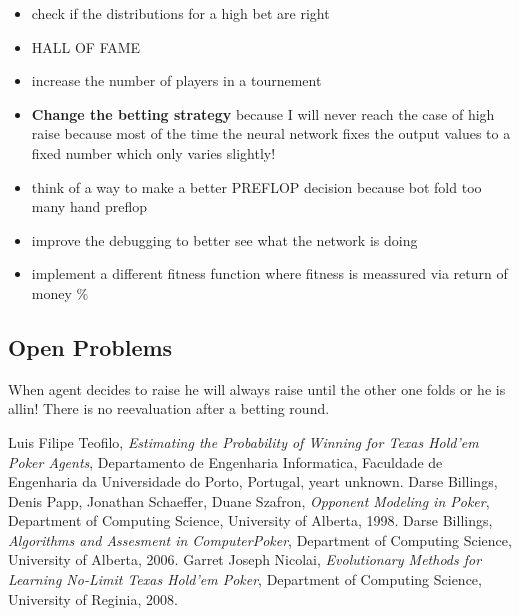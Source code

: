 \begin{itemize}
\item check if the distributions for a high bet are right
\item HALL OF FAME
\item increase the number of players in a tournement
\item \textbf{Change the betting strategy} because I will never reach the case of high raise because most of the time the neural network fixes the output values to a fixed number which only varies slightly!
\item think of a way to make a better PREFLOP decision because bot fold too many hand preflop
\item improve the debugging to better see what the network is doing
\item implement a different fitness function where fitness is meassured via return of money \%
\end{itemize}

\subsection{Open Problems}
\begin{itemize}
When agent decides to raise he will always raise until the other one folds or he is allin! There is no reevaluation after a betting round.
\end{itemize}


\begin{thebibliography}{9}
  Luis Filipe Teofilo,
  \textit{Estimating the Probability of Winning for Texas Hold'em Poker Agents},
  Departamento de Engenharia Informatica, Faculdade de Engenharia da Universidade do Porto,
  Portugal,
  yeart unknown.
  Darse Billings, Denis Papp, Jonathan Schaeffer, Duane Szafron,
  \textit{Opponent Modeling in Poker},
  Department of Computing Science, University of Alberta, 
 1998.
  Darse Billings,
  \textit{Algorithms and Assesment in ComputerPoker},
  Department of Computing Science, University of Alberta, 
 2006.
  Garret Joseph Nicolai,
  \textit{Evolutionary Methods for Learning No-Limit Texas Hold'em Poker},
  Department of Computing Science, University of Reginia, 
 2008.
\end{thebibliography}

\FloatBarrier\label{end-of-document}


